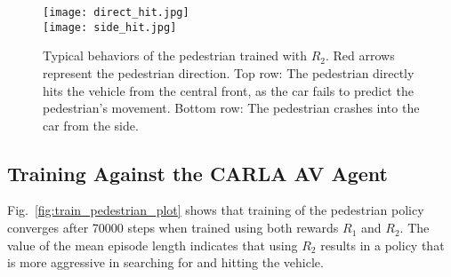 \documentclass[letterpaper, 10 pt, conference]{ieeeconf}
\newcommand{\Rs}{R_1}
\newcommand{\Rc}{R_2}
\begin{document}


\begin{figure*}[t]
    \centering
    \texttt{[image: direct\_hit.jpg]}
    \\
    \texttt{[image: side\_hit.jpg]}
    \caption{Typical behaviors of the pedestrian trained with $\Rc$. Red arrows represent the pedestrian direction. Top row: The pedestrian directly hits the vehicle from the central front, as the car fails to predict the pedestrian's movement. Bottom row: The pedestrian crashes into the car from the side.} %
    \label{fig:Pedestrian_behavior_visualization}
\end{figure*}

\subsection{Training Against the CARLA AV Agent}



Fig.~\ref{fig:train_pedestrian_plot} shows that training of the pedestrian policy converges after 70000 steps when trained using both rewards $\Rs$ and $\Rc$. %
The value of the mean episode length indicates that using $\Rc$ results in a policy that is more aggressive in searching for and hitting the vehicle. %
\end{document}
